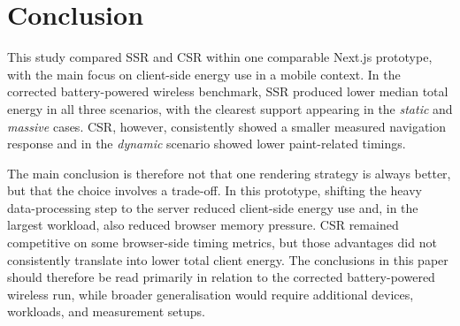 \newpage
\section{Conclusion}

This study compared SSR and CSR within one comparable Next.js prototype, with the main focus on client-side energy use in a mobile context. In the corrected battery-powered wireless benchmark, SSR produced lower median total energy in all three scenarios, with the clearest support appearing in the \textit{static} and \textit{massive} cases. CSR, however, consistently showed a smaller measured navigation response and in the \textit{dynamic} scenario showed lower paint-related timings.

The main conclusion is therefore not that one rendering strategy is always better, but that the choice involves a trade-off. In this prototype, shifting the heavy data-processing step to the server reduced client-side energy use and, in the largest workload, also reduced browser memory pressure. CSR remained competitive on some browser-side timing metrics, but those advantages did not consistently translate into lower total client energy. The conclusions in this paper should therefore be read primarily in relation to the corrected battery-powered wireless run, while broader generalisation would require additional devices, workloads, and measurement setups.
